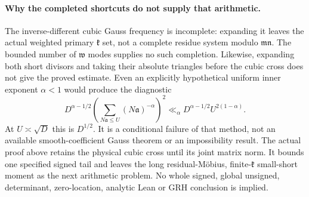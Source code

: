 \paragraph{Why the completed shortcuts do not supply that arithmetic.}
\label{gtl:failed}
The inverse-different cubic Gauss frequency is incomplete:
expanding it leaves the actual weighted primary
$\mathfrak k$ set, not a complete residue system modulo
$\mathfrak m\mathfrak n$. The bounded number of
$\mathfrak w$ modes supplies no such completion.
Likewise, expanding both short divisors and taking
their absolute triangles before the cubic cross
does not give the proved estimate. Even an explicitly
hypothetical uniform inner exponent $\alpha<1$ would
produce the diagnostic
\begin{equation}\label{gtl:triangle-diagnostic}
 D^{\alpha-1/2}
 \left(\sum_{N\mathfrak a\le U}(N\mathfrak a)^{-\alpha}\right)^2
 \ll_\alpha D^{\alpha-1/2}U^{2(1-\alpha)} .
\end{equation}
At $U\asymp\sqrt D$ this is $D^{1/2}$.
It is a conditional failure of that method, not an
available smooth-coefficient Gauss theorem or an
impossibility result. The actual proof above retains
the physical cubic cross until its joint matrix norm.
It bounds one specified signed tail and leaves the
long residual-M\"obius, finite-$\mathfrak k$ small-short
moment as the next arithmetic problem. No whole signed,
global unsigned, determinant, zero-location, analytic
Lean or GRH conclusion is implied.

